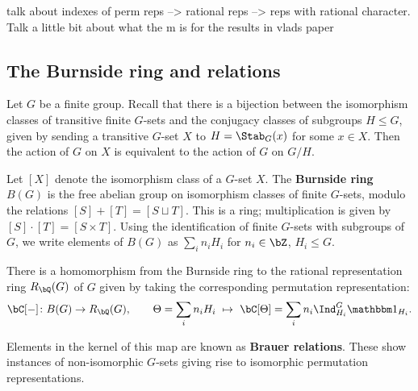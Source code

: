 

{\color{red} talk about indexes of perm reps --> rational reps --> reps with rational character. Talk a little bit about what the m is for the results in vlads paper} 

\subsection{The Burnside ring and relations}

Let $G$ be a finite group. Recall that there is a bijection between the isomorphism classes of transitive finite $G$-sets and the conjugacy classes of subgroups $H \leq G$, given by sending a transitive $G$-set $X$ to $H = \Stab_{G}(x)$ for some $x \in X$. Then the action of $G$ on $X$ is equivalent to the action of $G$ on $G / H$. 

\begin{defn}
Let $[X]$ denote the isomorphism class of a $G$-set $X$. 
The \textbf{Burnside ring} $B(G)$ is the free abelian group on isomorphism classes of finite $G$-sets, modulo the relations  $[S] + [T] = [S \sqcup T]$. This is a ring; multiplication is given by $[S] \cdot [T] = [S \times T]$. Using the identification of finite $G$-sets with subgroups of $G$, we write elements of $B(G)$ as $\sum_i n_i H_i$ for $n_i \in \bZ$, $H_i \leq G$. 
\end{defn}

\begin{notn}
There is a homomorphism from the Burnside ring to the rational representation ring $R_{\bQ}(G)$ of $G$ given by taking the corresponding permutation representation:
\[ \bC[-] \colon B(G) \to R_{\bQ}(G),  \qquad \Theta = \sum_i n_i H_i \ \mapsto \ \bC[\Theta ] = \sum_i n_i \Ind_{H_i}^G \trivial_{H_i}. \]
\end{notn}
Elements in the kernel of this map are known as \textbf{Brauer relations}. These show instances of non-isomorphic $G$-sets giving rise to isomorphic permutation representations. 

